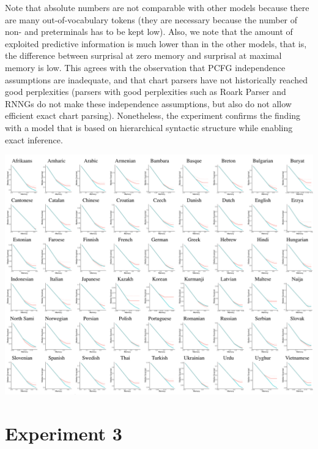 \documentclass[11pt,letterpaper]{article}
\begin{document}
Note that absolute numbers are not comparable with other models because there are many out-of-vocabulary tokens (they are necessary because the number of non- and preterminals has to be kept low).
Also, we note that the amount of exploited predictive information is much lower than in the other models, that is, the difference between surprisal at zero memory and surprisal at maximal memory is low.
This agrees with the observation that PCFG independence assumptions are inadequate, and that chart parsers have not historically reached good perplexities (parsers with good perplexities such as Roark Parser and RNNGs do not make these independence assumptions, but also do not allow efficient exact chart parsing).
Nonetheless, the experiment confirms the finding with a model that is based on hierarchical syntactic structure while enabling exact inference.

\begin{center}
\includegraphics[width=\textwidth]{results-table-pcfg.pdf}
\label{fig:resu-pcfg}
\end{center}




\section{Experiment 3}
\end{document}
